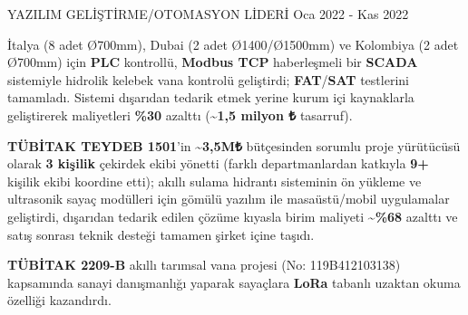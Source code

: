 \vspace{-3mm}

\begin{cventries}

  \cventry
    {YAZILIM GELİŞTİRME/OTOMASYON LİDERİ} %
    {} %
    {} %
    {Oca 2022 - Kas 2022} %
    {
      \begin{cvitems} %
        \item {İtalya (8 adet Ø700mm), Dubai (2 adet Ø1400/Ø1500mm) ve Kolombiya (2 adet Ø700mm) için \textbf{PLC} kontrollü, \textbf{Modbus TCP} haberleşmeli bir \textbf{SCADA} sistemiyle hidrolik kelebek vana kontrolü geliştirdi; \textbf{FAT}/\textbf{SAT} testlerini tamamladı. Sistemi dışarıdan tedarik etmek yerine kurum içi kaynaklarla geliştirerek maliyetleri \textbf{\%30} azalttı (\textasciitilde\textbf{1,5 milyon ₺} tasarruf).}
        \item {\textbf{TÜBİTAK TEYDEB 1501}'in \textbf{\textasciitilde3,5M₺} bütçesinden sorumlu proje yürütücüsü olarak \textbf{3 kişilik} çekirdek ekibi yönetti (farklı departmanlardan katkıyla \textbf{9+} kişilik ekibi koordine etti); akıllı sulama hidrantı sisteminin ön yükleme ve ultrasonik sayaç modülleri için gömülü yazılım ile masaüstü/mobil uygulamalar geliştirdi, dışarıdan tedarik edilen çözüme kıyasla birim maliyeti \textbf{\textasciitilde\%68} azalttı ve satış sonrası teknik desteği tamamen şirket içine taşıdı.}
        \item {\textbf{TÜBİTAK 2209-B} akıllı tarımsal vana projesi (No: 119B412103138) kapsamında sanayi danışmanlığı yaparak sayaçlara \textbf{LoRa} tabanlı uzaktan okuma özelliği kazandırdı.}
      \end{cvitems}
    }


\end{cventries}
